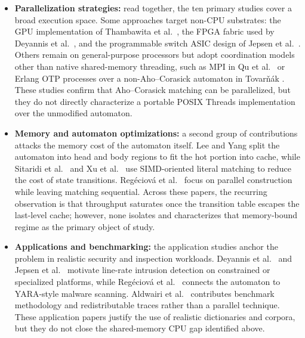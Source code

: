 \begin{itemize}
    \item \textbf{Parallelization strategies:} read together, the ten primary studies
    cover a broad execution space. Some approaches target non-CPU substrates: the
    GPU implementation of Thambawita et al.\ \cite{Vajira2018}, the FPGA fabric used
    by Deyannis et al.\ \cite{Deyannis2022Diversification}, and the programmable
    switch ASIC design of Jepsen et al.\ \cite{Jepsen2019PISA}. Others remain on
    general-purpose processors but adopt coordination models other than native
    shared-memory threading, such as MPI in Qu et al.\ \cite{Qu2016MPI} or Erlang OTP
    processes over a non-Aho--Corasick automaton in Tovar{\v{n}}ák
    \cite{Tovarnak2016REtrie}. These studies confirm that Aho--Corasick matching can
    be parallelized, but they do not directly characterize a portable POSIX Threads
    implementation over the unmodified automaton.

    \item \textbf{Memory and automaton optimizations:} a second group of contributions
    attacks the memory cost of the automaton itself. Lee and Yang
    \cite{LeeYang2017FHBM} split the automaton into head and body regions to fit the
    hot portion into cache, while Sitaridi et al.\ \cite{Sitaridi2016SIMD} and Xu et
    al.\ \cite{Xu2023Harry} use SIMD-oriented literal matching to reduce the cost of
    state transitions. Reg{\'e}ciov{\'a} et al.\ \cite{Regeciova2021MYARA} focus on
    parallel construction while leaving matching sequential. Across these papers, the
    recurring observation is that throughput saturates once the transition table
    escapes the last-level cache; however, none isolates and characterizes that
    memory-bound regime as the primary object of study.

    \item \textbf{Applications and benchmarking:} the application studies anchor the
    problem in realistic security and inspection workloads. Deyannis et al.\
    \cite{Deyannis2022Diversification} and Jepsen et al.\ \cite{Jepsen2019PISA}
    motivate line-rate intrusion detection on constrained or specialized platforms,
    while Reg{\'e}ciov{\'a} et al.\ \cite{Regeciova2021MYARA} connects the automaton
    to YARA-style malware scanning. Aldwairi et al.\
    \cite{Aldwairi2018Characterizing} contributes benchmark methodology and
    redistributable traces rather than a parallel technique. These application
    papers justify the use of realistic dictionaries and corpora, but they do not
    close the shared-memory CPU gap identified above.
\end{itemize}

